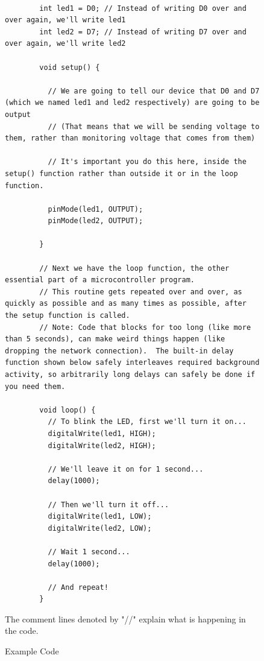 \documentclass{article}
\begin{document}
\begin{figure}
    \begin{lstlisting}

        int led1 = D0; // Instead of writing D0 over and over again, we'll write led1
        int led2 = D7; // Instead of writing D7 over and over again, we'll write led2

        void setup() {

          // We are going to tell our device that D0 and D7 (which we named led1 and led2 respectively) are going to be output
          // (That means that we will be sending voltage to them, rather than monitoring voltage that comes from them)

          // It's important you do this here, inside the setup() function rather than outside it or in the loop function.

          pinMode(led1, OUTPUT);
          pinMode(led2, OUTPUT);

        }

        // Next we have the loop function, the other essential part of a microcontroller program.
        // This routine gets repeated over and over, as quickly as possible and as many times as possible, after the setup function is called.
        // Note: Code that blocks for too long (like more than 5 seconds), can make weird things happen (like dropping the network connection).  The built-in delay function shown below safely interleaves required background activity, so arbitrarily long delays can safely be done if you need them.

        void loop() {
          // To blink the LED, first we'll turn it on...
          digitalWrite(led1, HIGH);
          digitalWrite(led2, HIGH);

          // We'll leave it on for 1 second...
          delay(1000);

          // Then we'll turn it off...
          digitalWrite(led1, LOW);
          digitalWrite(led2, LOW);

          // Wait 1 second...
          delay(1000);

          // And repeat!
        }
    \end{lstlisting}
    \caption{Example Code} \label{fig:ExampleCode}
    \vspace{0.5cm}
    The comment lines denoted by "//" explain what is happening in the code.
\end{figure}
\end{document}
